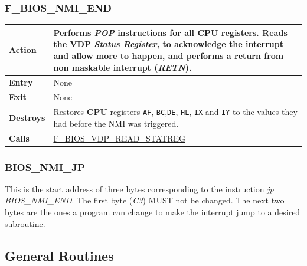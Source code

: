 \documentclass[a4paper,11pt]{article}
\begin{document}
    \subsubsection{F\_BIOS\_NMI\_END}
    \label{func:fbiosnmiend}
    \begin{tabular}{l p{9cm}}
        \hline\textbf{Action}
        & Performs \textit{POP} instructions for all \textbf{CPU} registers.
        Reads the \textbf{VDP} \textit{Status Register}, to acknowledge the
        interrupt and allow more to happen, and  performs a return from non
        maskable interrupt (\textit{RETN}).\\
        \hline\textbf{Entry} & None\\
        \hline\textbf{Exit} & None\\
        \hline\textbf{Destroys} & Restores \textbf{CPU} registers \texttt{AF},
        \texttt{BC},\texttt{DE}, \texttt{HL}, \texttt{IX} and \texttt{IY} to the
        values they had before the NMI was triggered.\\
        \hline\textbf{Calls} & \hyperref[func:fbiosvdpreadstatreg]
        {F\_BIOS\_VDP\_READ\_STATREG}\\
        \hline
    \end{tabular}

    \subsubsection{BIOS\_NMI\_JP}
    \label{func:fbiosnmijp}

    This is the start address of three bytes corresponding to the instruction
    \textit{jp BIOS\_NMI\_END}. The first byte (\textit{C3}) MUST not be changed.
    The next two bytes are the ones a program can change to make the interrupt
    jump to a desired subroutine.

    \subsection{General Routines}

\end{document}
